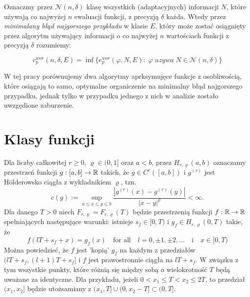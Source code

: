 \documentclass[oik, pdftex, robocza, man]{mgrwms}
\begin{document}
    Oznaczmy przez $\mathcal{N}(n, \delta)$ klasę wszystkich (adaptacyjnych) informacji $N$, które używają co najwyżej $n$ ewaluacji funkcji, z precyzją $\delta$ każda. Wtedy przez \textit{minimalany błąd najgorszego przykładu} w klasie $E$, który może zostać osiągnięty przez algorytm używający informacji o co najwyżej $n$ wartościach funkcji z precyzją $\delta$ rozumiemy:

    \begin{equation*}
        r^{wor}_{p}(n, \delta, E) = \inf\{ e^{wor}_{p}(\varphi, N, E) : \; \varphi \; uzywa \; N \in \mathcal{N}(n, \delta) \}
    \end{equation*}

    W tej pracy porównujemy dwa algorytmy aprksymujęce funkcje z osobliwością, które osiągają to samo, optymalne organiczenie na minimalny błąd najgorszego przypadku, jednak tylko w przypadku jednego z nich w analizie zostało uwzgędione zaburzenie.


\section{Klasy funkcji}


    Dla liczby całkowitej $ r \geq 0$, $\varrho \in (0,1]$ oraz $a < b$, przez $H_{r, \varrho}(a,b)$ oznaczamy przestrzeń funkcji $g: [a,b] \rightarrow \mathbb{R}$ takich, że $g \in C^r([a, b])$ i $g^{(r)}$ jest Hölderowsko ciągła z wykładnikiem $\varrho$, tzn.
    \begin{equation*}
        c(g) := \sup_{a \leq x \leq y \leq b} \frac{|g^{(r)}(x) - g^{(r)}(y)|}{|x-y|^{\varrho}} < \infty.
    \end{equation*}
    Dla danego $T > 0$ niech $F_{r, \varrho} = F_{r, \varrho}(T)$ będzie przestrzenią funkcji $f: \mathbb{R} \rightarrow \mathbb{R}$ spełniających następujące warunki: istnieje $s_f \in [0, T)$ i $g_f \in H_{r, \varrho}(0,T)$ takie, że
    \begin{equation*}
        f(lT + s_f + x) = g_f(x) \quad \text{for all} \quad l = 0, \pm 1, \pm 2, \ldots \quad \text{i} \quad x \in [0, T)
    \end{equation*}
    Można powiedzieć, że $f$ jest 'kopią' $g_f$ na każdym z przedziałów $(lT + s_f, (l + 1)T + s_f]$ i $f$ jest prawostronnie ciągła na $lT + s_f$. W związku z tym wszystkie punkty, które różnią się między sobą o wielokrotność $T$ będą uważane za identyczne. Dla przykładu, jeżeli $0 < x_1 \leq T < x_2 \leq 2T$, to przedział $(x_1, x_2]$ będzie utożsamiany z $(x_1,T] \cup (0, x_2 - T] \subset (0, T]$.
\end{document}
